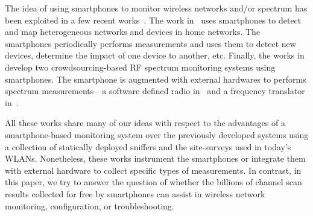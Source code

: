 The idea of using smartphones to monitor wireless networks and/or spectrum has
been exploited in a few recent
works~\cite{nychis:hotwireless2014,nika:hotwireless2014,zhang:hotmobile2015}.
The work in~\cite{nychis:hotwireless2014} uses smartphones to detect and map
heterogeneous networks and devices in home networks. The smartphones
periodically performs measurements and uses them to detect new devices,
determine the impact of one device to another, etc. Finally, the works
in~\cite{nika:hotwireless2014,zhang:hotmobile2015} develop two
crowdsourcing-based RF spectrum monitoring systems using smartphones. The
smartphone is augmented with external hardwares to performs spectrum
measurements---a software defined radio in~\cite{nika:hotwireless2014} and a
frequency translator in~\cite{zhang:hotmobile2015}.

All these works share many of our ideas with respect to the advantages
of a smartphone-based monitoring system over the previously developed
systems using a collection of statically deployed sniffers and the
site-surveys used in today's WLANs. Nonetheless, these works
instrument the smartphones or integrate them with external hardware to
collect specific types of measurements. In contrast, in this paper, we
try to answer the question of whether the billions of \wifi{} channel
scan results collected for free by smartphones can assist in wireless
network monitoring, configuration, or troubleshooting.
